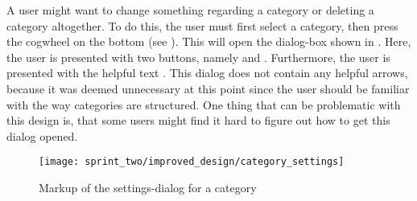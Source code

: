 A user might want to change something regarding a category or deleting a category altogether. To do this, the user must first select a category, then press the cogwheel on the bottom (see ). This will open the dialog-box shown in . Here, the user is presented with two buttons, namely  and . Furthermore, the user is presented with the helpful text . This dialog does not contain any helpful arrows, because it was deemed unnecessary at this point since the user should be familiar with the way categories are structured. One thing that can be problematic with this design is, that some users might find it hard to figure out how to get this dialog opened. 

\begin{figure}[!htbp]
    \centering
    \texttt{[image: sprint\_two/improved\_design/category\_settings]}
    \caption{Markup of the settings-dialog for a category}
    \label{fig:improved_design_category_settings}
\end{figure}

\FloatBarrier